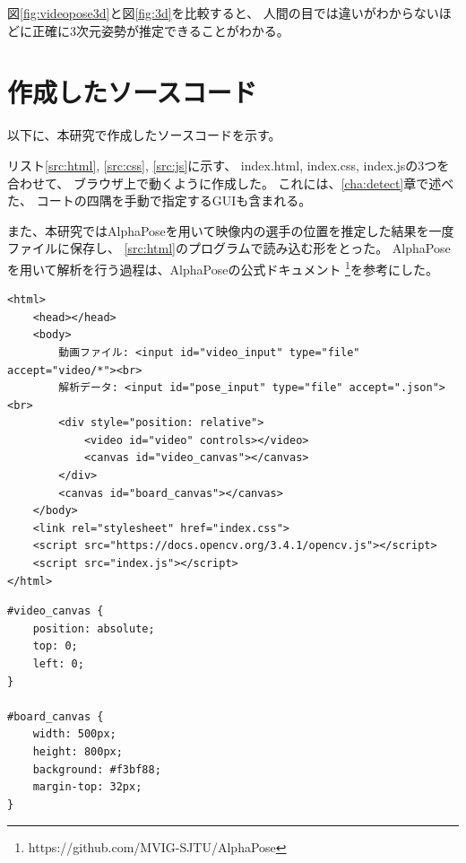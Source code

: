 \documentclass[a4j, fleqn, 12pt]{jsreport}
\begin{document}
    図\ref{fig:videopose3d}と図\ref{fig:3d}を比較すると、
    人間の目では違いがわからないほどに正確に3次元姿勢が推定できることがわかる。

\chapter{作成したソースコード} \label{app:code}
    以下に、本研究で作成したソースコードを示す。

    リスト\ref{src:html}, \ref{src:css}, \ref{src:js}に示す、
    index.html, index.css, index.jsの3つを合わせて、
    ブラウザ上で動くように作成した。
    これには、\ref{cha:detect}章で述べた、
    コートの四隅を手動で指定するGUIも含まれる。

    また、本研究ではAlphaPoseを用いて映像内の選手の位置を推定した結果を一度ファイルに保存し、
    \ref{src:html}のプログラムで読み込む形をとった。
    AlphaPoseを用いて解析を行う過程は、AlphaPoseの公式ドキュメント
    \footnote{https://github.com/MVIG-SJTU/AlphaPose}を参考にした。

    \begin{lstlisting}[caption=index.html, label=src:html]
<html>
    <head></head>
    <body>
        動画ファイル: <input id="video_input" type="file" accept="video/*"><br>
        解析データ: <input id="pose_input" type="file" accept=".json"><br>
        <div style="position: relative">
            <video id="video" controls></video>
            <canvas id="video_canvas"></canvas>
        </div>
        <canvas id="board_canvas"></canvas>
    </body>
    <link rel="stylesheet" href="index.css">
    <script src="https://docs.opencv.org/3.4.1/opencv.js"></script>
    <script src="index.js"></script>
</html>\end{lstlisting}

    \begin{lstlisting}[caption=index.css, label=src:css]
#video_canvas {
    position: absolute;
    top: 0;
    left: 0;
}

#board_canvas {
    width: 500px;
    height: 800px;
    background: #f3bf88;
    margin-top: 32px;
}\end{lstlisting}
\end{document}
